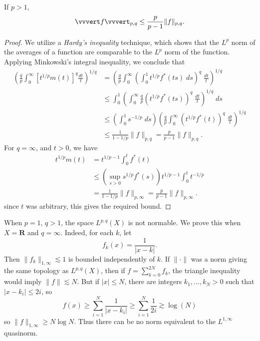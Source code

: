 \begin{theorem}
    If $p > 1$,
    \[ \vvvert f \vvvert_{p,q} \leq \frac{p}{p-1} \| f \|_{p,q}. \]
\end{theorem}
\begin{proof}
    We utilize a \emph{Hardy's inequality} technique, which shows that the $L^p$ norm of the averages of a function are comparable to the $L^p$ norm of the function. Applying Minkowski's integral inequality, we conclude that
    \begin{align*}
        \left( \frac{q}{p} \int_0^\infty [t^{1/p} m(t)]^q \frac{dt}{t} \right)^{1/q} &= \left( \frac{q}{p} \int_0^\infty \left( \int_0^1 t^{1/p} f^*(ts)\; ds \right)^q\; \frac{dt}{t} \right)^{1/q}\\
        &\leq \int_0^1 \left( \int_0^\infty \frac{q}{p} (t^{1/p} f^*(ts))^q\; \frac{dt}{t} \right)^{1/q}\; ds\\
        &\leq \left( \int_0^1 s^{- 1/p}\; ds \right) \left( \frac{q}{p} \int_0^\infty (t^{1/p} f^*(t))^q\; \frac{dt}{t} \right)^{1/q}\\
        &\leq \frac{1}{1 - 1/p} \| f \|_{p,q} = \frac{p}{p - 1} \| f \|_{p,q}.
    \end{align*}
    For $q = \infty$, and $t > 0$, we have
    \begin{align*}
        t^{1/p} m(t) &= t^{1/p - 1} \int_0^t f^*(t)\\
        &\leq (\sup_{s > 0} s^{1/p} f^*(s)) t^{1/p - 1} \int_0^t t^{-1/p}\\
        &= \frac{1}{1 - 1/p} \| f \|_{p,\infty} = \frac{p}{p-1} \| f \|_{p,\infty}.
    \end{align*}
    since $t$ was arbitrary, this gives the required bound.
\end{proof}

\begin{remark}
    When $p = 1$, $q > 1$, the space $L^{p,q}(X)$ is not normable. We prove this when $X = \mathbf{R}$ and $q = \infty$. Indeed, for each $k$, let
    \[ f_k(x) = \frac{1}{|x - k|}. \]
    Then $\| f_k \|_{1,\infty} \lesssim 1$ is bounded independently of $k$. If $\| \cdot \|$ was a norm giving the same topology as $L^{p,q}(X)$, then if $f = \sum_{k = 0}^{2N} f_k$, the triangle inequality would imply $\| f \| \lesssim N$. But if $|x| \leq N$, there are integers $k_1, \dots, k_N > 0$ such that $|x - k_i| \leq 2i$, so
    \[ f(x) \geq \sum_{i = 1}^N \frac{1}{|x - k_i|} \geq \sum_{i = 1}^N \frac{1}{2i} \gtrsim \log(N) \]
    so $\| f \|_{1,\infty} \geq N \log N$. Thus there can be no norm equivalent to the $L^{1,\infty}$ quasinorm.
\end{remark}

